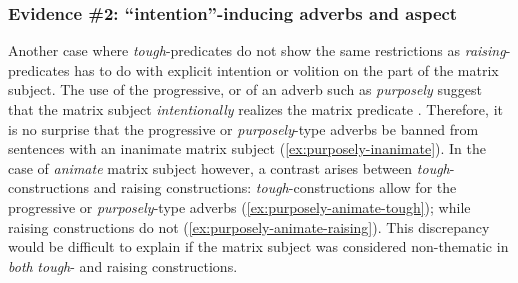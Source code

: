 \documentclass[11pt]{article}
\begin{document}
\subsubsection{Evidence \#2: ``intention''-inducing adverbs and aspect}
Another case where \textit{tough}-predicates do not show the same restrictions as \textit{raising}-predicates has to do with explicit intention or volition on the part of the matrix subject. The use of the progressive, or of an adverb such as \textit{purposely} suggest that the matrix subject \textit{intentionally} realizes the matrix predicate \cite{Lasnik1974,Hukari1990}. Therefore, it is no surprise that the progressive or \textit{purposely}-type adverbs be banned from sentences with an inanimate matrix subject (\ref{ex:purposely-inanimate}). In the case of \textit{animate} matrix subject however, a contrast arises between \textit{tough}-constructions and raising constructions: \textit{tough}-constructions allow for the progressive or \textit{purposely}-type adverbs (\ref{ex:purposely-animate-tough}); while raising constructions do not (\ref{ex:purposely-animate-raising}). This discrepancy would be difficult to explain if the matrix subject was considered non-thematic in \textit{both} \textit{tough}- and raising constructions.
\begin{exe}
	\ex 
	\begin{xlist}
	\end{xlist}\label{ex:purposely-inanimate}
	\ex
	\begin{xlist}
		\label{ex:purposely-animate-tough}
		\label{ex:purposely-animate-raising}
	\end{xlist}
\end{exe}
\end{document}
